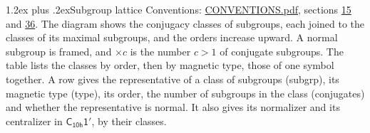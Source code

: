 \documentclass[10pt,a4paper]{article}
\makeatletter
\renewcommand\section{\@startsection{section}{1}{\z@}{-3ex plus -1ex minus -.2ex}%
  {1.2ex plus .2ex}{\normalfont\large\sffamily\bfseries\color{parttitle}}}
\numberwithin{equation}{section}
\newcommand{\grp}[1]{\mathsf{#1}}
\makeatother
\begin{document}
\section{Subgroup lattice}\label{s:subgroups}
Conventions: \href{../../CONVENTIONS.pdf}{CONVENTIONS.pdf}, sections \href{../../../rotation/CONVENTIONS.pdf\#conv.15}{15} and \href{../../CONVENTIONS.pdf\#conv.36}{36}.
The diagram shows the conjugacy classes of subgroups, each joined to the classes of its maximal subgroups, and the orders increase upward. \label{n:index.conjugates.c}A normal subgroup is framed, and ${\times}c$ is the number $c > 1$ of conjugate subgroups. The table lists the classes by order, then by magnetic type, those of one symbol together. \label{n:head.subgroup}\label{n:head.magnetic.type}\label{n:head.order}\label{n:head.conjugates}\label{n:head.normal}A row gives the representative of a class of subgroups (subgrp), its magnetic type (type), its order, the number of subgroups in the class (conjugates) and whether the representative is normal. \label{n:head.normalizer}\label{n:head.centralizer}It also gives its normalizer and its centralizer in $\grp{C_{10h}1'}$, by their classes. 
\end{document}
